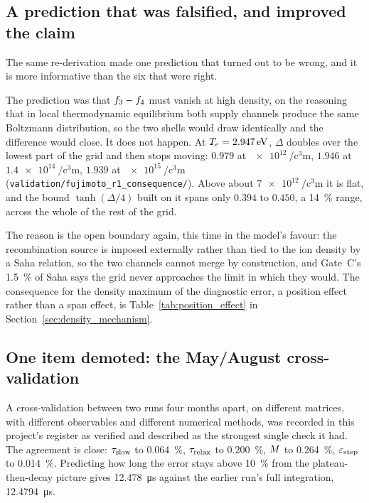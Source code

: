 \subsection{A prediction that was falsified, and improved the claim}

The same re-derivation made one prediction that turned out to be wrong, and it
is more informative than the six that were right.

The prediction was that $f_{3}-f_{4}$ must vanish at high density, on
the reasoning that in local thermodynamic equilibrium both supply channels
produce the same Boltzmann distribution, so the two shells would draw
identically and the difference would close. It does not happen. At
$T_e = \SI{2.947}{\electronvolt}$, $\Delta$ doubles over the lowest part of the grid and then
stops moving: $0.979$ at $\SI{e12}{\per\cubic\centi\metre}$, $1.946$ at
$\SI{1.4e14}{\per\cubic\centi\metre}$, $1.939$ at
$\SI{e15}{\per\cubic\centi\metre}$
(\texttt{validation/fujimoto\_r1\_consequence/}). Above about
$\SI{7e12}{\per\cubic\centi\metre}$ it is flat, and the bound $\tanh(\Delta/4)$
built on it spans only $0.394$ to $0.450$, a \SI{14}{\percent} range, across the
whole of the rest of the grid.

The reason is the open boundary again, this time in the model's favour: the
recombination source is imposed externally rather than tied to the ion density
by a Saha relation, so the two channels cannot merge by construction, and
Gate~C's \SI{1.5}{\percent} of Saha says the grid never approaches the limit in
which they would. The consequence for the density maximum of the diagnostic
error, a position effect rather than a span effect, is
Table~\ref{tab:position_effect} in Section~\ref{sec:density_mechanism}.

\subsection{One item demoted: the May/August cross-validation}

A cross-validation between two runs four months apart, on different matrices,
with different observables and different numerical methods, was recorded in this
project's register as verified and described as the strongest single check it
had. The agreement is close: $\tau_{\mathrm{slow}}$ to \SI{0.064}{\percent}, $\tau_{\mathrm{relax}}$ to
\SI{0.200}{\percent}, $M$ to \SI{0.264}{\percent}, $\varepsilon_{\mathrm{step}}$ to
\SI{0.014}{\percent}. Predicting how long the error stays above
\SI{10}{\percent} from the plateau-then-decay picture gives
\SI{12.478}{\micro\second} against the earlier run's full integration,
\SI{12.4794}{\micro\second}.

